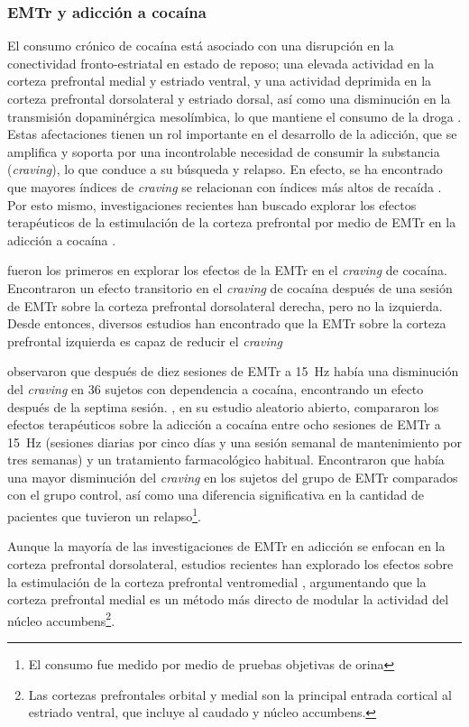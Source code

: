 \subsubsection{EMTr y adicción a cocaína}
El consumo crónico de cocaína está asociado con una disrupción en la conectividad fronto-estriatal en estado de reposo; una elevada actividad en la corteza prefrontal medial y estriado ventral, y una actividad deprimida en la corteza prefrontal dorsolateral y estriado dorsal, así como una disminución en la transmisión dopaminérgica mesolímbica, lo que mantiene el consumo de la droga \parencite{Rachid2018}.
Estas afectaciones tienen un rol importante en el desarrollo de la adicción, que se amplifica y soporta por una incontrolable necesidad de consumir la substancia (\textit{craving}), lo que conduce a su búsqueda y relapso.
En efecto, se ha encontrado que mayores índices de \textit{craving} se relacionan con índices más altos de recaída \parencite{Sinha2006,Volkow2000a,Volkow2016}.
Por esto mismo, investigaciones recientes han buscado explorar los efectos terapéuticos de la estimulación de la corteza prefrontal por medio de EMTr en la adicción a cocaína \parencite{Bolloni2018}. \par
\textcite{Camprodon2007} fueron los primeros en explorar los efectos de la EMTr en el \textit{craving} de cocaína.
Encontraron un efecto transitorio en el \textit{craving} de cocaína después de una sesión de EMTr sobre la corteza prefrontal dorsolateral derecha, pero no la izquierda.
Desde entonces, diversos estudios han encontrado que la EMTr sobre la corteza prefrontal izquierda es capaz de reducir el \textit{craving} \par
\textcite{Politi2008} observaron que después de diez sesiones de EMTr a \SI{15}{\hertz} había una disminución del \textit{craving} en 36 sujetos con dependencia a cocaína, encontrando un efecto después de la septima sesión.
\textcite{Terraneo2016}, en su estudio aleatorio abierto, compararon los efectos terapéuticos sobre la adicción a cocaína entre ocho sesiones de EMTr a \SI{15}{\hertz} (sesiones diarias por cinco días y una sesión semanal de mantenimiento por tres semanas) y un tratamiento farmacológico habitual.
Encontraron que había una mayor disminución del \textit{craving} en los sujetos del grupo de EMTr comparados con el grupo control, así como una diferencia significativa en la cantidad de pacientes que tuvieron un relapso\footnote{El consumo fue medido por medio de pruebas objetivas de orina}. \par
Aunque la mayoría de las investigaciones de EMTr en adicción se enfocan en la corteza prefrontal dorsolateral, estudios recientes han explorado los efectos sobre la estimulación de la corteza prefrontal ventromedial \parencite{Hanlon2015,Kearney-Ramos2018a}, argumentando que la corteza prefrontal medial es un método más directo de modular la actividad del núcleo accumbens\footnote{Las cortezas prefrontales orbital y medial son la principal entrada cortical al estriado ventral, que incluye al caudado y núcleo accumbens.}.
